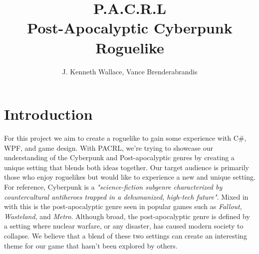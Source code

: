 \documentclass[10pt,conference,onecolumn,compsoc]{IEEEtran}
\begin{document}
\title{P.A.C.R.L\\Post-Apocalyptic Cyberpunk Roguelike}
\author{J. Kenneth Wallace, Vance Brenderabrandis\\}


\maketitle
\IEEEdisplaynontitleabstractindextext
\IEEEpeerreviewmaketitle



\section{Introduction}

For this project we aim to create a roguelike to gain some experience with C\#, WPF, and game design. With PACRL, we're trying to showcase our understanding of the Cyberpunk and Post-apocalyptic genres by creating a unique setting that blends both ideas together. Our target audience is primarily those who enjoy roguelikes but would like to experience a new  and unique setting. For reference, Cyberpunk is a \emph{"science-fiction subgenre characterized by countercultural antiheroes trapped in a dehumanized, high-tech future"}\cite{IEEEhowto:cyberpunk}. Mixed in with this is the post-apocalyptic genre seen in popular games such as \emph{Fallout}, \emph{Wasteland}, and \emph{Metro}. Although broad, the post-apocalyptic genre is defined by a setting where nuclear warfare, or any disaster, has caused modern society to collapse. We believe that a blend of these two settings can create an interesting theme for our game that hasn't been explored by others.
\end{document}
